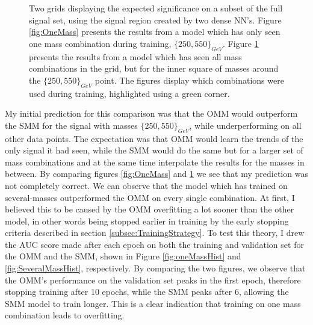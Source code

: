 \begin{figure}
{\begin{subfigure}{.6\textwidth}
        \vspace{-1.cm}
        \caption{}
        \label{fig:SeveralMass}
    \end{subfigure}
    }
    \caption[Two grids displaying the expected significance on a subset of the full signal set, using the signal region 
    created by two dense \acs{NN}'s, each training on different amounts of signal.]{Two grids displaying the expected significance 
    on a subset of the full signal set, using the signal region created by two dense \ac{NN}'s. Figure \ref{fig:OneMass} presents the results 
    from a model which has only seen one mass combination during training, $\{250,550\}_{GeV}$. Figure 
    \ref{fig:SeveralMass} presents the results from a model which has seen all mass combinations in the grid, but for the inner square of masses
    around the $\{250,550\}_{GeV}$ point. The figures display which combinations were used during training, highlighted using a green corner. 
    }
    \label{fig:Interpolation}
\end{figure}
My initial prediction for this comparison was that the \ac{OMM} would outperform the \ac{SMM} for the signal with masses
$\{250,550\}_{GeV}$, while underperforming on all other data points. The expectation was that \ac{OMM} 
would learn the trends of the only signal it had seen, while the \ac{SMM} would do the same but for a larger set of mass combinations and 
at the same time interpolate the results for the masses in between. By comparing figures \ref{fig:OneMass} and \ref{fig:SeveralMass} we 
see that my prediction was not completely correct. We can observe that the model which has trained on several-masses outperformed the 
\ac{OMM} on every single combination. At first, I believed this to be caused by the \ac{OMM} overfitting a lot sooner than the other 
model, in other words being stopped earlier in training by the early stopping criteria described in section \ref{subsec:TrainingStrategy}. 
To test this theory, I drew the \ac{AUC} score made after each epoch on both the training and validation set for the \ac{OMM} and the 
\ac{SMM}, shown in Figure \ref{fig:oneMassHist} and \ref{fig:SeveralMassHist}, respectively. By comparing the two figures,
we observe that the \ac{OMM}'s performance on the validation set peaks in the first epoch, therefore stopping training after 
10 epochs, while the \ac{SMM} peaks after 6, allowing the \ac{SMM} model to train longer. This is a clear indication that training on 
one mass combination leads to overfitting. 
